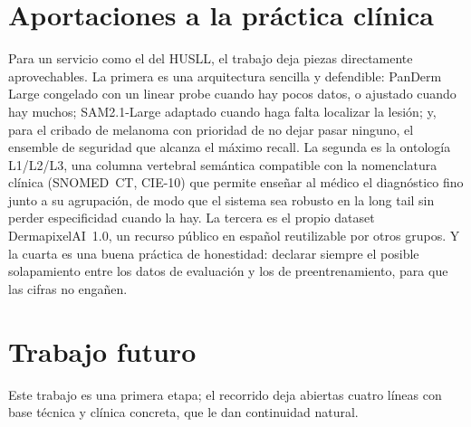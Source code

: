 \section{Aportaciones a la práctica clínica}

Para un servicio como el del HUSLL, el trabajo deja piezas directamente
aprovechables. La primera es una arquitectura sencilla y defendible:
PanDerm Large congelado con un linear probe cuando hay pocos datos, o
ajustado cuando hay muchos; SAM2.1-Large adaptado cuando haga falta
localizar la lesión; y, para el cribado de melanoma con prioridad de no
dejar pasar ninguno, el ensemble de seguridad que alcanza el máximo
recall. La segunda es la ontología L1/L2/L3, una columna vertebral
semántica compatible con la nomenclatura clínica (SNOMED~CT, CIE-10) que
permite enseñar al médico el diagnóstico fino junto a su agrupación, de
modo que el sistema sea robusto en la long tail sin perder especificidad
cuando la hay. La tercera es el propio dataset DermapixelAI~1.0, un
recurso público en español reutilizable por otros grupos. Y la cuarta es
una buena práctica de honestidad: declarar siempre el posible solapamiento
entre los datos de evaluación y los de preentrenamiento, para que las
cifras no engañen.

\section{Trabajo futuro}
\label{sec:lineas-abiertas}

Este trabajo es una primera etapa; el recorrido deja abiertas cuatro
líneas con base técnica y clínica concreta, que le dan continuidad
natural.

